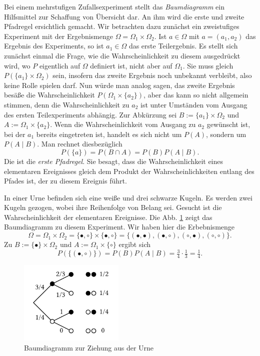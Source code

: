 Bei einem mehrstufigen Zufallsexperiment stellt das \emph{Baumdiagramm} ein
Hilfsmittel zur Schaffung von Übersicht dar. An ihm wird die erste
und zweite Pfadregel ersichtlich gemacht. Wir betrachten dazu zunächst
ein zweistufiges Experiment mit der Ergebnismenge $\Omega =
\Omega_1\times\Omega_2$. Ist $a\in\Omega$ mit $a=(a_1,a_2)$ das Ergebnis
des Experiments, so ist $a_1\in\Omega$ das erste Teilergebnis. Es stellt
sich zunächst einmal die Frage, wie die Wahrscheinlichkeit zu diesem
ausgedrückt wird, wo $P$ eigentlich auf $\Omega$ definiert ist,
nicht aber auf $\Omega_1$. Sie muss gleich $P(\{a_1\}\times\Omega_2)$
sein, insofern das zweite Ergebnis noch unbekannt verbleibt, also
keine Rolle spielen darf. Nun würde man analog sagen, das zweite Ergebnis
besäße die Wahrscheinlichkeit $P(\Omega_1\times\{a_2\})$, aber das
kann so nicht allgemein stimmen, denn die Wahrscheinlichkeit zu $a_2$
ist unter Umständen vom Ausgang des ersten Teilexperiments abhängig.
Zur Abkürzung sei $B:=\{a_1\}\times\Omega_2$ und $A:=\Omega_1\times\{a_2\}$.
Wenn die Wahrscheinlichkeit vom Ausgang zu $a_2$ gewünscht ist, bei
der $a_1$ bereits eingetreten ist, handelt es sich nicht um $P(A)$,
sondern um $P(A\mid B)$. Man rechnet diesbezüglich
\[P(\{a\}) = P(B\cap A) = P(B)P(A\mid B).\]
Die ist die \emph{erste Pfadregel}. Sie besagt,
dass die Wahrscheinlichkeit eines elementaren Ereignisses gleich dem
Produkt der Wahrscheinlichkeiten entlang des Pfades ist, der zu diesem
Ereignis führt.

 In einer Urne befinden sich eine weiße und
drei schwarze Kugeln. Es werden zwei Kugeln gezogen, wobei ihre
Reihenfolge von Belang sei. Gesucht ist die Wahrscheinlichkeit der
elementaren Ereignisse. Die Abb. \ref{fig:Baumdiagramm-Urne} zeigt das
Baumdiagramm zu diesem Experiment. Wir haben hier die Erbebnismenge
\[\Omega = \Omega_1\times\Omega_2 = \{\bullet,\circ\}\times\{\bullet,\circ\}
= \{(\bullet,\bullet),(\bullet,\circ),(\circ,\bullet),(\circ,\circ)\}.\]
Zu $B := \{\bullet\}\times\Omega_2$ und $A := \Omega_1\times\{\circ\}$
ergibt sich
\[P(\{(\bullet,\circ)\}) = P(B)P(A\mid B) = \tfrac{3}{4}\cdot\tfrac{1}{3} = \tfrac{1}{4}.\]

\begin{figure}\setlength{\abovecaptionskip}{0pt}
\begin{center}
\includegraphics[width=50mm]{img/Baumdiagramm-Urne.pdf}
\caption{Baumdiagramm zur Ziehung aus der Urne}
\label{fig:Baumdiagramm-Urne}
\end{center}
\end{figure}

